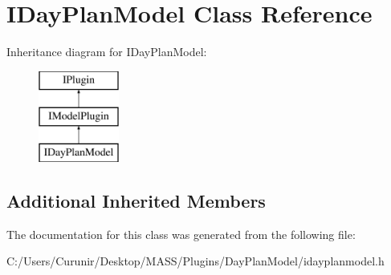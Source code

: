 \hypertarget{class_i_day_plan_model}{}\section{I\+Day\+Plan\+Model Class Reference}
\label{class_i_day_plan_model}
Inheritance diagram for I\+Day\+Plan\+Model\+:\begin{figure}[H]
\begin{center}
\leavevmode
\includegraphics[height=3.000000cm]{class_i_day_plan_model}
\end{center}
\end{figure}
\subsection*{Additional Inherited Members}


The documentation for this class was generated from the following file\+:\begin{DoxyCompactItemize}
\item 
C\+:/\+Users/\+Curunir/\+Desktop/\+M\+A\+S\+S/\+Plugins/\+Day\+Plan\+Model/idayplanmodel.\+h\end{DoxyCompactItemize}
